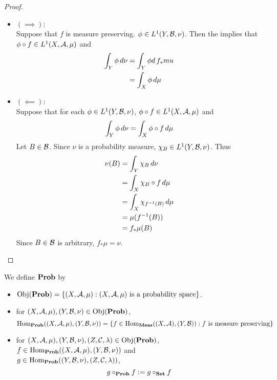 \documentclass{book}
\begin{document}
	\begin{proof}\
		\begin{itemize}
			\item $(\implies)$: \\
			Suppose that $f$ is measure preserving. $\phi \in L^1(Y, \mathcal{B}, \nu)$. Then the  implies that $\phi \circ f \in L^1(X, \mathcal{A}, \mu)$ and 
			\begin{align*}
				\int_Y \phi \, d \nu 
				& = \int_Y \phi d \, f_* mu \\
				& = \int_X \phi \, d \mu \\
			\end{align*} 
			\item $(\impliedby)$: \\
			Suppose that for each $\phi \in L^1(Y, \mathcal{B}, \nu)$, $\phi \circ f \in L^1(X, \mathcal{A}, \mu)$ and 
			$$\int_Y \phi \, d \nu = \int_X \phi \circ f \, d \mu $$
			Let $B \in \mathcal{B}$. Since $\nu$ is a probability measure, $\chi_B \in L^1(Y, \mathcal{B}, \nu)$. Thus 
			\begin{align*}
				\nu(B)
				& = \int_Y \chi_B \, d \nu \\
				& = \int_X \chi_B \circ f \, d \mu \\
				& = \int_X \chi_{f^{-1}(B)} \, d \mu \\
				& = \mu(f^{-1}(B)) \\
				& = f_*\mu(B)
			\end{align*}
			Since $B \in \mathcal{B}$ is arbitrary, $f_* \mu = \nu$. 
		\end{itemize}
	\end{proof}

	\begin{defn}
		We define $\operatorname*{\text{\textbf{Prob}}}$ by 
		\begin{itemize}
			\item $\operatorname{Obj}(\operatorname*{\text{\textbf{Prob}}}) = \{(X, \mathcal{A}, \mu): (X, \mathcal{A}, \mu) \text{ is a probability space}\}$.
			\item for $(X, \mathcal{A}, \mu), (Y, \mathcal{B}, \nu) \in \operatorname{Obj}(\operatorname*{\text{\textbf{Prob}}})$, 
			$$\operatorname{Hom}_{\operatorname*{\text{\textbf{Prob}}}}((X, \mathcal{A}, \mu), (Y, \mathcal{B}, \nu)) = \{f \in  \operatorname{Hom}_{\operatorname*{\text{\textbf{Meas}}}}((X, \mathcal{A}), (Y, \mathcal{B})): f \text{ is measure preserving} \}$$
			\item for $(X, \mathcal{A}, \mu), (Y, \mathcal{B}, \nu), (Z, \mathcal{C}, \lambda) \in \operatorname{Obj}(\operatorname*{\text{\textbf{Prob}}})$, $f \in \operatorname{Hom}_{\operatorname*{\text{\textbf{Prob}}}}((X, \mathcal{A}, \mu), (Y, \mathcal{B}, \nu))$ and \\
			$g \in  \operatorname{Hom}_{\operatorname*{\text{\textbf{Prob}}}}((Y, \mathcal{B}, \nu), (Z, \mathcal{C}, \lambda))$, 
			$$g \circ_{\operatorname*{\text{\textbf{Prob}}}} f \vcentcolon= g \circ_{\operatorname*{\text{\textbf{Set}}}} f$$
		\end{itemize}
	\end{defn}
	
\end{document}
